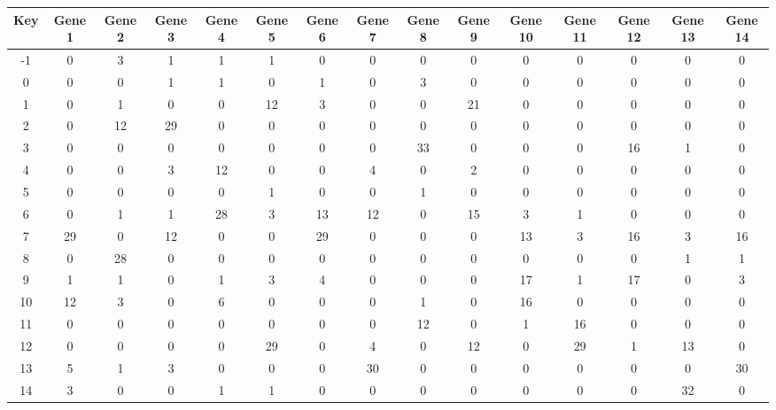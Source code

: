 \begin{tabular}{|c|c|c|c|c|c|c|c|c|c|c|c|c|c|c|}
\hline
Key & Gene 1 & Gene 2 & Gene 3 & Gene 4 & Gene 5 & Gene 6 & Gene 7 & Gene 8 & Gene 9 & Gene 10 & Gene 11 & Gene 12 & Gene 13 & Gene 14 \\
\hline
-1 & 0 & 3 & 1 & 1 & 1 & 0 & 0 & 0 & 0 & 0 & 0 & 0 & 0 & 0 \\
0 & 0 & 0 & 1 & 1 & 0 & 1 & 0 & 3 & 0 & 0 & 0 & 0 & 0 & 0 \\
1 & 0 & 1 & 0 & 0 & 12 & 3 & 0 & 0 & 21 & 0 & 0 & 0 & 0 & 0 \\
2 & 0 & 12 & 29 & 0 & 0 & 0 & 0 & 0 & 0 & 0 & 0 & 0 & 0 & 0 \\
3 & 0 & 0 & 0 & 0 & 0 & 0 & 0 & 33 & 0 & 0 & 0 & 16 & 1 & 0 \\
4 & 0 & 0 & 3 & 12 & 0 & 0 & 4 & 0 & 2 & 0 & 0 & 0 & 0 & 0 \\
5 & 0 & 0 & 0 & 0 & 1 & 0 & 0 & 1 & 0 & 0 & 0 & 0 & 0 & 0 \\
6 & 0 & 1 & 1 & 28 & 3 & 13 & 12 & 0 & 15 & 3 & 1 & 0 & 0 & 0 \\
7 & 29 & 0 & 12 & 0 & 0 & 29 & 0 & 0 & 0 & 13 & 3 & 16 & 3 & 16 \\
8 & 0 & 28 & 0 & 0 & 0 & 0 & 0 & 0 & 0 & 0 & 0 & 0 & 1 & 1 \\
9 & 1 & 1 & 0 & 1 & 3 & 4 & 0 & 0 & 0 & 17 & 1 & 17 & 0 & 3 \\
10 & 12 & 3 & 0 & 6 & 0 & 0 & 0 & 1 & 0 & 16 & 0 & 0 & 0 & 0 \\
11 & 0 & 0 & 0 & 0 & 0 & 0 & 0 & 12 & 0 & 1 & 16 & 0 & 0 & 0 \\
12 & 0 & 0 & 0 & 0 & 29 & 0 & 4 & 0 & 12 & 0 & 29 & 1 & 13 & 0 \\
13 & 5 & 1 & 3 & 0 & 0 & 0 & 30 & 0 & 0 & 0 & 0 & 0 & 0 & 30 \\
14 & 3 & 0 & 0 & 1 & 1 & 0 & 0 & 0 & 0 & 0 & 0 & 0 & 32 & 0 \\
\hline
\end{tabular}